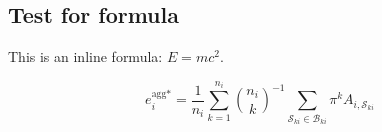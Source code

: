 \documentclass[12pt,a4paper]{article}
\begin{document}
\subsection{Test for formula}
This is an inline formula: $E=mc^2$.

\begin{equation}
\label{eq:equ 1}
e_i^{\text{agg}*} = \frac{1}{n_i} \sum_{k=1}^{n_i} \binom{n_i}{k}^{-1} \sum\limits_{\mathcal{S}_{ki} \in \mathcal{B}_{ki}} \pi^k A_{i,\mathcal{S}_{ki}}
\end{equation}

\newpage
\printbibliography[title={References}]
\end{document}
